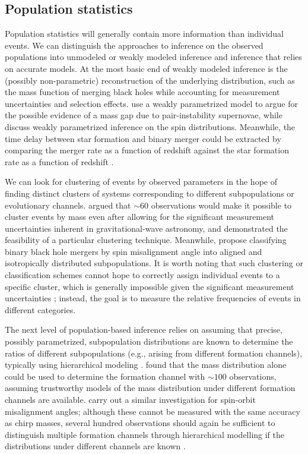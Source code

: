 \documentclass[iop,onecolumn]{revtex4}
\begin{document}
\subsection{Population statistics}
Population statistics will generally contain more information than individual events.  We can distinguish the approaches to inference on the observed populations into unmodeled or weakly modeled inference and inference that relies on accurate models. At the most basic end of weakly modeled inference is the (possibly non-parametric) reconstruction of the underlying distribution, such as the mass function of merging black holes \citep{Mandel:2010stat,BBH:O1} while accounting for measurement uncertainties and selection effects.  \citet{Fishbach:2017mass} use a weakly parametrized model to argue for the possible evidence of a mass gap due to pair-instability supernovae, while \citet{TalbotThrane:2017} discuss weakly parametrized inference on the spin distributions.  Meanwhile, the time delay between star formation and binary merger could be extracted by comparing the merger rate as a function of redshift against the star formation rate as a function of redshift \citep{Mandel:2016select}.  


We can look for clustering of events by observed parameters in the hope of finding distinct clusters of systems corresponding to different subpopulations or evolutionary channels.  \citet{Mandel:2015} argued that $\sim 60$ observations would make it possible to cluster events by mass even after allowing for the significant measurement uncertainties inherent in gravitational-wave astronomy, and \citet{Mandel:2016cluster} demonstrated the feasibility of a particular clustering technique.  Meanwhile, \citet{Farr:2018} propose classifying binary black hole mergers by spin misalignment angle into aligned and isotropically distributed subpopulations.  It is worth noting that such clustering or classification schemes cannot hope to correctly assign individual events to a specific cluster, which is generally impossible given the significant measurement uncertainties \citep{Littenberg:2015}; instead, the goal is to measure the relative frequencies of events in different categories.

The next level of population-based inference relies on assuming that precise, possibly parametrized, subpopulation distributions are known to determine the ratios of different subpopulations (e.g., arising from different formation channels), typically using hierarchical modeling \citep[extreme deconvolution in the language of][]{Hogg:2010}.  \citet{Zevin:2017} found that the mass distribution alone could be used to determine the formation channel with $\sim 100$ observations, assuming trustworthy models of the mass distribution under different formation channels are available.  \citet{Vitale:2015,Stevenson:2017spin} carry out a similar investigation for spin-orbit misalignment angles; although these cannot be measured with the same accuracy as chirp masses, several hundred observations should again be sufficient to distinguish multiple formation channels through hierarchical modelling if the distributions under different channels are known \citep{Stevenson:2017spin}.   
\end{document}
